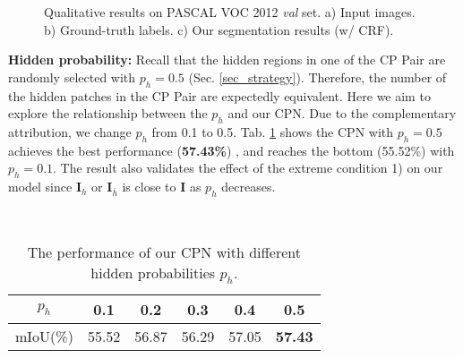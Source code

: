 \documentclass[10pt,twocolumn,letterpaper]{article}
\begin{document}
\begin{figure*}[htbp]
\hspace{-4.5mm}
\centering
\caption{Qualitative results on PASCAL VOC 2012 \textit{val} set. a) Input images. b) Ground-truth labels. c) Our segmentation results (w/ CRF).}
\label{fig:compare_sota}
\end{figure*}

\noindent\textbf{Hidden probability:}\; Recall that the hidden regions in one of the CP Pair are randomly selected with $p_h=0.5$ (Sec. \ref{sec_strategy}). Therefore, the number of the hidden patches in the CP Pair are expectedly equivalent. Here we aim to explore the relationship between the $p_h$ and our CPN. Due to the complementary attribution, we change $p_h$ from 0.1 to 0.5. Tab. \ref{tab:ablation on ph} shows the CPN with $p_h=0.5$ achieves the best performance (\textbf{57.43\%}) , and reaches the bottom (55.52\%) with $p_h=0.1$. The result also validates the effect of the extreme condition 1) on our model since $\boldsymbol{I}_h$ or $\boldsymbol{I}_{\overline h}$ is close to $\boldsymbol{I}$ as $p_h$ decreases.
\begin{table}[!htbp]\small
\centering\
\begin{tabular}{c|c|c|c|c|c}
\hline
$p_h$ & 0.1 & 0.2 & 0.3  & 0.4 & 0.5\\
\hline
mIoU(\%) & 55.52 & 56.87 & 56.29 & 57.05 &\textbf{57.43} \\
\hline
\end{tabular}
\caption{The performance of our CPN with different hidden probabilities $p_h$. }
\label{tab:ablation on ph}
\vspace{-2mm}
\end{table}
\end{document}
